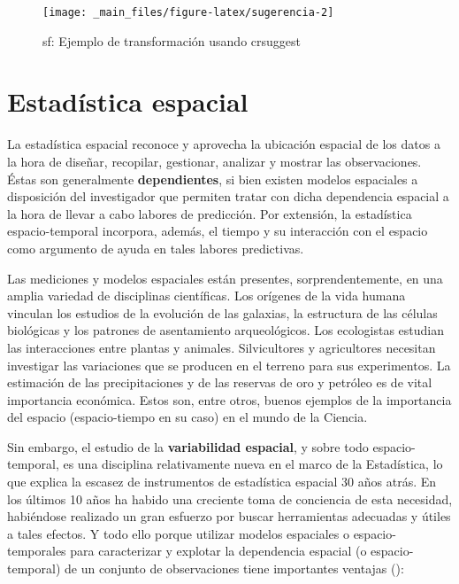 \documentclass[
]{book}
\begin{document}
\begin{figure}

{\centering \texttt{[image: \_main\_files/figure-latex/sugerencia-2]} 

}

\caption{sf: Ejemplo de transformación usando crsuggest}\label{fig:sugerencia-2}
\end{figure}

\hypertarget{estaduxedstica-espacial}{%
\chapter{Estadística espacial}\label{estaduxedstica-espacial}}

La estadística espacial reconoce y aprovecha la ubicación espacial de los datos
a la hora de diseñar, recopilar, gestionar, analizar y mostrar las
observaciones. Éstas son generalmente \textbf{dependientes}, si bien existen modelos
espaciales a disposición del investigador que permiten tratar con dicha
dependencia espacial a la hora de llevar a cabo labores de predicción. Por
extensión, la estadística espacio-temporal incorpora, además, el tiempo y su
interacción con el espacio como argumento de ayuda en tales labores predictivas.

Las mediciones y modelos espaciales están presentes, sorprendentemente, en una
amplia variedad de disciplinas científicas. Los orígenes de la vida humana
vinculan los estudios de la evolución de las galaxias, la estructura de las
células biológicas y los patrones de asentamiento arqueológicos. Los ecologistas
estudian las interacciones entre plantas y animales. Silvicultores y
agricultores necesitan investigar las variaciones que se producen en el terreno
para sus experimentos. La estimación de las precipitaciones y de las reservas de
oro y petróleo es de vital importancia económica. Estos son, entre otros, buenos
ejemplos de la importancia del espacio (espacio-tiempo en su caso) en el mundo
de la Ciencia.

Sin embargo, el estudio de la \textbf{variabilidad espacial}, y sobre todo
espacio-temporal, es una disciplina relativamente nueva en el marco de la
Estadística, lo que explica la escasez de instrumentos de estadística espacial
30 años atrás. En los últimos 10 años ha habido una creciente toma de conciencia
de esta necesidad, habiéndose realizado un gran esfuerzo por buscar herramientas
adecuadas y útiles a tales efectos. Y todo ello porque utilizar modelos
espaciales o espacio-temporales para caracterizar y explotar la dependencia
espacial (o espacio-temporal) de un conjunto de observaciones tiene importantes
ventajas (\citet{montero_el_al_2011}):
\end{document}
